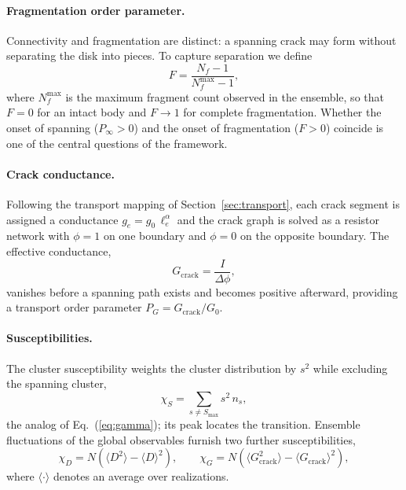 \documentclass[preprint,12pt]{elsarticle}
\begin{document}
\paragraph{Fragmentation order parameter.}
Connectivity and fragmentation are distinct: a spanning crack may form without
separating the disk into pieces. To capture separation we define
\begin{equation}
F = \frac{N_f - 1}{N_f^{\max} - 1},
\label{eq:F}
\end{equation}
where $N_f^{\max}$ is the maximum fragment count observed in the ensemble, so that
$F=0$ for an intact body and $F\to 1$ for complete fragmentation. Whether the onset of
spanning ($P_\infty>0$) and the onset of fragmentation ($F>0$) coincide is one of the
central questions of the framework.

\paragraph{Crack conductance.}
Following the transport mapping of Section~\ref{sec:transport}, each crack segment is
assigned a conductance $g_e = g_0\,\ell_e^{\alpha}$ and the crack graph is solved as a
resistor network with $\phi=1$ on one boundary and $\phi=0$ on the opposite boundary.
The effective conductance,
\begin{equation}
G_{\mathrm{crack}} = \frac{I}{\Delta\phi},
\label{eq:Gcrack}
\end{equation}
vanishes before a spanning path exists and becomes positive afterward, providing a
transport order parameter $P_G = G_{\mathrm{crack}}/G_0$.

\paragraph{Susceptibilities.}
The cluster susceptibility weights the cluster distribution by $s^2$ while excluding
the spanning cluster,
\begin{equation}
\chi_S = \sum_{s \neq S_{\max}} s^2\, n_s,
\label{eq:chiS}
\end{equation}
the analog of Eq.~(\ref{eq:gamma}); its peak locates the transition. Ensemble
fluctuations of the global observables furnish two further susceptibilities,
\begin{equation}
\chi_D = N\!\left(\langle D^2\rangle - \langle D\rangle^2\right), \qquad
\chi_G = N\!\left(\langle G_{\mathrm{crack}}^2\rangle - \langle G_{\mathrm{crack}}\rangle^2\right),
\label{eq:chiDG}
\end{equation}
where $\langle\cdot\rangle$ denotes an average over realizations.
\end{document}
